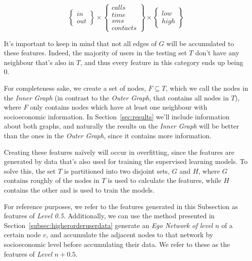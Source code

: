 \begin{equation}
\begin{Bmatrix} in \\ out \end{Bmatrix}
\times
\begin{Bmatrix} calls \\ time \\ sms \\ contacts \end{Bmatrix}
\times
\begin{Bmatrix} low \\ high \end{Bmatrix}
\label{eq:matcatuserdata}
\end{equation}

It's important to keep in mind that not all edges of $G$ will be accumulated to these features. Indeed, the majority of users in the testing set $T$ don't have any neighbour that's also in $T$, and thus every feature in this category ends up being $0$.

For completeness sake, we create a set of nodes, $F \subseteq T$, which we call the nodes in the \emph{Inner Graph} (in contrast to the \emph{Outer Graph}, that contains all nodes in $T$), where $F$ only contains nodes which have at least one neighbour with socioeconomic information. In Section~\ref{sec:results} we'll include information about both graphs, and naturally the results on the \emph{Inner Graph} will be better than the ones in the \emph{Outer Graph}, since it contains more information.

Creating these features naïvely will occur in overfitting, since the features are generated by data that's also used for training the supervised learning models. To solve this, the set $T$ is partitioned into two disjoint sets, $G$ and $H$, where $G$ contains roughly  of the nodes in $T$ is used to calculate the features, while $H$ contains the other  and is used to train the models.

For reference purposes, we refer to the features generated in this Subsection as features of \emph{Level 0.5}. Additionally, we can use the method presented in Section~\ref{subsec:higherorderuserdata} generate an \emph{Ego Network of level $n$} of a certain node $v$, and accumulate the adjacent nodes to that network by socioeconomic level before accumulating their data. We refer to these as the features of \emph{Level $n + 0.5$}.
